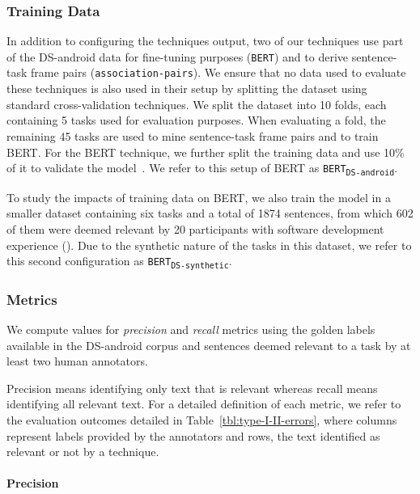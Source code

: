 \subsubsection{Training Data}


In addition to configuring the techniques output, two of our techniques use part of the  \acs{DS-android} data for fine-tuning purposes (\texttt{BERT}) and to derive sentence-task frame pairs (\texttt{association-pairs}).
We ensure that no data used to evaluate these techniques is also used in their setup by 
splitting the dataset using standard cross-validation techniques.
We split the dataset into 10 folds, each containing 5 tasks used for evaluation purposes. When evaluating a fold, the remaining 45 tasks are used to mine sentence-task frame pairs
and to train BERT. 
For the BERT technique, we further split the training data and use 10\% of it to validate the model~\cite{Chaparro2017, fucci2019, Petrosyan2015}.
We refer to this setup of BERT as \texttt{BERT\textsubscript{DS-android}}.


To study the impacts of training data on BERT, we also train the model in a smaller dataset containing six tasks and a total of 1874 sentences, from which 602 of them were deemed relevant by 20 participants with software development experience (). Due to the synthetic nature of the tasks in this dataset, we refer to this 
second configuration as \texttt{BERT\textsubscript{DS-synthetic}}.




\subsubsection{Metrics}


We compute values for \textit{precision} and \textit{recall} metrics using the golden labels available in the \acs{DS-android} corpus and sentences deemed relevant to a task by at least two human annotators.

Precision means identifying only text that is relevant whereas recall means identifying all relevant text.
For a detailed definition of each metric, we refer to the evaluation outcomes detailed in Table~\ref{tbl:type-I-II-errors}, where  columns represent  labels provided by the annotators and rows,
the text identified as relevant or not by a technique.

\medskip




\paragraph{\textbf{Precision}}

